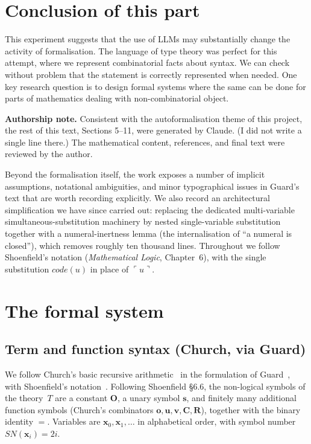 \documentclass[11pt]{article}
\theoremstyle{plain}
\theoremstyle{definition}
\theoremstyle{remark}
\newcommand{\code}[1]{\mathit{code}(#1)}
\newcommand{\SN}{\mathit{SN}}
\begin{document}
\medskip

\section*{Conclusion of this part}

This experiment suggests that the use of LLMs may substantially change the activity of formalisation.
The language of type theory
was perfect for this attempt, where we represent combinatorial facts about syntax. We can check without problem that the
statement is correctly represented when needed. One key research question is to design formal systems where the same can be
done for parts of mathematics dealing with non-combinatorial object.

{\bf Authorship note.}
Consistent with the autoformalisation theme of this project, the rest of this text, Sections 5–11, were generated by Claude.
(I did not write a single line there.)
The mathematical content, references, and final text were reviewed by the author.


\newpage


Beyond the formalisation itself, the work
exposes a number of implicit assumptions, notational ambiguities, and
minor typographical issues in Guard's text that are worth recording
explicitly.  We also record an architectural simplification we have since
carried out: replacing the dedicated multi-variable simultaneous-substitution
machinery by nested single-variable substitution together with a
numeral-inertness lemma (the internalisation of ``a numeral is closed''),
which removes roughly ten thousand lines.  Throughout we follow Shoenfield's notation
(\emph{Mathematical Logic}, Chapter~6), with the single substitution
$\code{u}$ in place of $\ulcorner u \urcorner$.



\section{The formal system}



\subsection{Term and function syntax (Church, via Guard)}

We follow Church's basic recursive arithmetic~\cite{Church} in the
formulation of Guard~\cite{Guard63}, with Shoenfield's
notation~\cite{Shoenfield}.  Following Shoenfield {\S}6.6, the
non-logical symbols of the theory~$T$
are a constant $\mathbf{O}$, a unary symbol $\mathbf{s}$, and finitely
many additional function symbols (Church's combinators
$\mathbf{o},\mathbf{u},\mathbf{v},\mathbf{C},\mathbf{R}$), together with
the binary identity $=$.  Variables are $\mathbf{x}_0, \mathbf{x}_1,
\ldots$ in alphabetical order, with symbol number
$\SN(\mathbf{x}_i) = 2i$.
\end{document}
